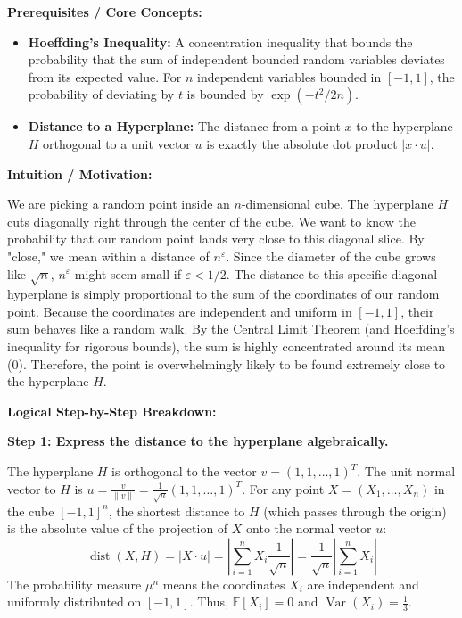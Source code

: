 \begin{solution}
\textbf{Prerequisites / Core Concepts:}
\begin{itemize}
    \item \textbf{Hoeffding's Inequality:} A concentration inequality that bounds the probability that the sum of independent bounded random variables deviates from its expected value. For $n$ independent variables bounded in $[-1, 1]$, the probability of deviating by $t$ is bounded by $\exp(-t^2 / 2n)$.
    \item \textbf{Distance to a Hyperplane:} The distance from a point $x$ to the hyperplane $H$ orthogonal to a unit vector $u$ is exactly the absolute dot product $|x \cdot u|$.
\end{itemize}

\textbf{Intuition / Motivation:}

We are picking a random point inside an $n$-dimensional cube. The hyperplane $H$ cuts diagonally right through the center of the cube. We want to know the probability that our random point lands very close to this diagonal slice. 
By "close," we mean within a distance of $n^\varepsilon$. Since the diameter of the cube grows like $\sqrt{n}$, $n^\varepsilon$ might seem small if $\varepsilon < 1/2$.
The distance to this specific diagonal hyperplane is simply proportional to the sum of the coordinates of our random point. Because the coordinates are independent and uniform in $[-1, 1]$, their sum behaves like a random walk. By the Central Limit Theorem (and Hoeffding's inequality for rigorous bounds), the sum is highly concentrated around its mean (0). Therefore, the point is overwhelmingly likely to be found extremely close to the hyperplane $H$.

\textbf{Logical Step-by-Step Breakdown:}

\textbf{Step 1: Express the distance to the hyperplane algebraically.}

The hyperplane $H$ is orthogonal to the vector $v = (1, 1, \dots, 1)^T$.
The unit normal vector to $H$ is $u = \frac{v}{\|v\|} = \frac{1}{\sqrt{n}} (1, 1, \dots, 1)^T$.
For any point $X = (X_1, \dots, X_n)$ in the cube $[-1, 1]^n$, the shortest distance to $H$ (which passes through the origin) is the absolute value of the projection of $X$ onto the normal vector $u$:
\[ \operatorname{dist}(X, H) = |X \cdot u| = \left| \sum_{i=1}^n X_i \frac{1}{\sqrt{n}} \right| = \frac{1}{\sqrt{n}} \left| \sum_{i=1}^n X_i \right| \]
The probability measure $\mu^n$ means the coordinates $X_i$ are independent and uniformly distributed on $[-1, 1]$.
Thus, $\mathbb{E}[X_i] = 0$ and $\operatorname{Var}(X_i) = \frac{1}{3}$.


\end{solution}
